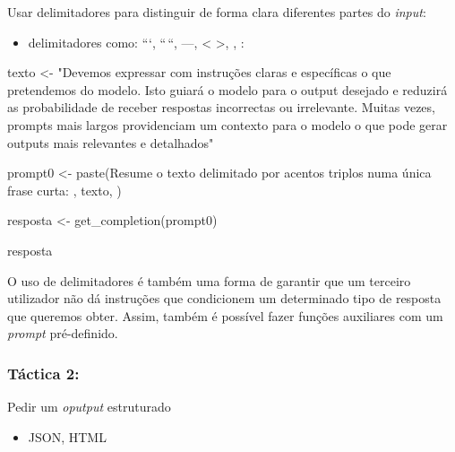 \documentclass[
  letterpaper,
  paper=6in:9in,
  pagesize=pdftex,
  headinclude=on,
  footinclude=on,
  12pt]{scrbook}
\newenvironment{Shaded}{\begin{snugshade}}{\end{snugshade}}
\newcommand{\FunctionTok}[1]{\textcolor[rgb]{0.28,0.35,0.67}{#1}}
\newcommand{\NormalTok}[1]{\textcolor[rgb]{0.00,0.23,0.31}{#1}}
\newcommand{\OtherTok}[1]{\textcolor[rgb]{0.00,0.23,0.31}{#1}}
\newcommand{\StringTok}[1]{\textcolor[rgb]{0.13,0.47,0.30}{#1}}
\providecommand{\tightlist}{%
  \setlength{\itemsep}{0pt}\setlength{\parskip}{0pt}}\usepackage{longtable,booktabs,array}
\begin{document}
Usar delimitadores para distinguir de forma clara diferentes partes do
\emph{input}:

\begin{itemize}
\tightlist
\item
  delimitadores como: ```, ``\,``, ---, \textless{} \textgreater, , :
\end{itemize}

\begin{Shaded}
\begin{Highlighting}[]
\NormalTok{texto }\OtherTok{\textless{}{-}} \StringTok{"Devemos expressar com instruções claras e específicas o que pretendemos do modelo. }
\StringTok{Isto guiará o modelo para o output desejado e reduzirá as probabilidade de }
\StringTok{receber respostas incorrectas ou irrelevante. Muitas vezes, }
\StringTok{prompts mais largos providenciam um contexto para o modelo o que pode gerar outputs mais relevantes e detalhados"}

\NormalTok{prompt0 }\OtherTok{\textless{}{-}} \FunctionTok{paste}\NormalTok{(}\StringTok{\textquotesingle{}Resume o texto delimitado por acentos triplos numa única frase curta: }
\StringTok{                 \textasciigrave{}\textasciigrave{}\textasciigrave{}\textquotesingle{}}\NormalTok{, texto, }\StringTok{\textquotesingle{}\textasciigrave{}\textasciigrave{}\textquotesingle{}}\NormalTok{)}

\NormalTok{resposta }\OtherTok{\textless{}{-}} \FunctionTok{get\_completion}\NormalTok{(prompt0)}

\NormalTok{resposta}
\end{Highlighting}
\end{Shaded}

O uso de delimitadores é também uma forma de garantir que um terceiro
utilizador não dá instruções que condicionem um determinado tipo de
resposta que queremos obter. Assim, também é possível fazer funções
auxiliares com um \emph{prompt} pré-definido.

\hypertarget{tuxe1ctica-2}{%
\subsubsection{Táctica 2:}\label{tuxe1ctica-2}}

Pedir um \emph{oputput} estruturado

\begin{itemize}
\tightlist
\item
  JSON, HTML
\end{itemize}
\end{document}
